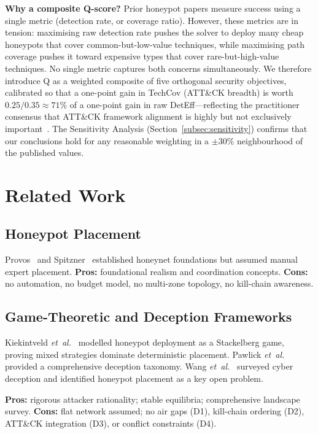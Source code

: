 \documentclass[journal]{IEEEtran}
\newcommand{\etal}{\emph{et~al.}}
\begin{document}
\textbf{Why a composite Q-score?}
Prior honeypot papers measure success using a single metric
(detection rate, or coverage ratio).
However, these metrics are in tension: maximising raw
detection rate pushes the solver to deploy many cheap
honeypots that cover common-but-low-value techniques,
while maximising path coverage pushes it toward expensive
types that cover rare-but-high-value techniques.
No single metric captures both concerns simultaneously.
We therefore introduce Q as a weighted composite of five
orthogonal security objectives, calibrated so that a
one-point gain in TechCov (ATT\&CK breadth) is worth
$0.25/0.35 \approx 71\%$ of a one-point gain in raw
DetEff---reflecting the practitioner consensus that
ATT\&CK framework alignment is highly but not exclusively
important~\cite{mitre2023}.
The Sensitivity Analysis (Section~\ref{subsec:sensitivity})
confirms that our conclusions hold for any reasonable
weighting in a $\pm30\%$ neighbourhood of the published
values.

\section{Related Work}
\label{sec:related}

\subsection{Honeypot Placement}

Provos~\cite{provos2004} and Spitzner~\cite{spitzner2003}
established honeynet foundations but assumed manual expert
placement.
\textbf{Pros:} foundational realism and coordination
concepts.
\textbf{Cons:} no automation, no budget model, no
multi-zone topology, no kill-chain awareness.

\subsection{Game-Theoretic and Deception Frameworks}

Kiekintveld \etal{}~\cite{kiekintveld2015} modelled honeypot
deployment as a Stackelberg game, proving mixed strategies
dominate deterministic placement.
Pawlick \etal{}~\cite{pawlick2019} provided a comprehensive
deception taxonomy.
Wang \etal{}~\cite{wang2018} surveyed cyber deception and
identified honeypot placement as a key open problem.

\textbf{Pros:} rigorous attacker rationality; stable
equilibria; comprehensive landscape survey.
\textbf{Cons:} flat network assumed; no air gaps (D1),
kill-chain ordering (D2), ATT\&CK integration (D3), or
conflict constraints (D4).
\end{document}
